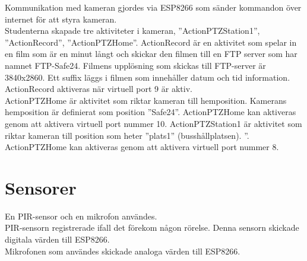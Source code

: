 Kommunikation med kameran gjordes via ESP8266 som sänder kommandon över internet för att styra kameran.\\

Studenterna skapade tre aktiviteter i kameran, ”ActionPTZStation1”, ”ActionRecord”, ”ActionPTZHome”.
ActionRecord är en aktivitet som spelar in en film som är en minut långt och skickar den filmen till en FTP server som har namnet FTP-Safe24. Filmens upplösning som skickas till FTP-server är 3840x2860. Ett suffix läggs i filmen som innehåller datum och tid information. ActionRecord aktiveras när virtuell port 9 är aktiv.\\
ActionPTZHome är aktivitet som riktar kameran till hemposition. Kamerans hemposition är definierat som position ”Safe24”. ActionPTZHome kan aktiveras genom att aktivera virtuell port nummer 10.
ActionPTZStation1 är aktivitet som riktar kameran till position som heter ”plats1” (busshållplatsen). ”. ActionPTZHome kan aktiveras genom att aktivera virtuell port nummer 8.


\section{Sensorer}
En PIR-sensor och en mikrofon användes.\\

PIR-sensorn registrerade ifall det förekom någon rörelse. Denna sensorn skickade digitala värden till ESP8266.\\

Mikrofonen som användes skickade analoga värden till ESP8266.\\






 



